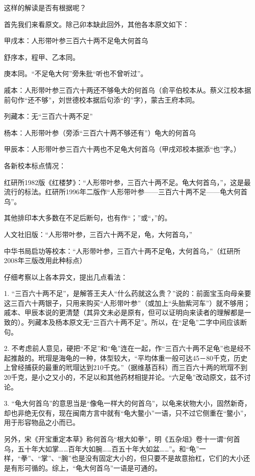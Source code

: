 这样的解读是否有根据呢？

首先我们来看原文。除己卯本缺此回外，其他各本原文如下：

甲戌本：人形带叶参三百六十两不足龟大何首乌

舒序本，程甲、乙本同。

庚本同。``不足龟大何''旁朱批``听也不曾听过''。

戚本：人形带叶参三百六十两还不够龟大的何首乌（俞平伯校本从。蔡义江校本据前句作``还不够''，刘世德校本据后句添``的''字），蒙古王府本同。

列藏本：无``三百六十两不足''

杨本：人形带叶参（旁添``三百六十两不够还有''）龟大的何首乌

甲辰本：人形带叶参三百六十两也不足龟大何首乌（甲戌邓校本据添``也''字。）

各新校本标点情况：

红研所1982版《红楼梦》：``人形带叶参，三百六十两不足。龟大何首乌，''，这是最流行的标法。红研所1996年二版作``人形带叶参------三百六十两不足------龟大何首乌''。

其他排印本大多数在不足后断句，也有作``；''或``，''的。

人文社旧版：``人形带叶参，三百六十两不足，龟，大何首乌，''

中华书局启功等校本：``人形带叶参，三百六十两不足龟，大何首乌，''（红研所2008年三版改用此种标点）

仔细考察以上各本异文，提出几点看法：

1.
``三百六十两不足''，是解答王夫人``什么药就这么贵？''说的：前面宝玉向母亲要这三百六十两银子，只用来购买``人形带叶参''（或加上``头胎紫河车''）就不够用；戚本、甲辰本说的更清楚（其异文未必是原有，但可以证明向来读者的理解都是一致的）。列藏本及杨本原文无``三百六十两不足''。所以，在``足龟''二字中间应该断句。

2.
不考虑前人意见，硬把``不足''和``龟''连在一起，作``三百六十两不足龟''也是经不起推敲的。玳瑁是海龟的一种，体型较大，``平均体重一般可达45－80千克，历史上曾经捕获的最重的玳瑁达到210千克。''（据维基百科）而三百六十两的玳瑁不到20千克，是小之又小的，不足以和其他药材相提并论。``六足龟''改动原文，兹不讨论。

3.
``龟大何首乌''的意思当是``像龟一样大的何首乌''，以龟来状物大小，固然新奇，却也非绝无仅有，现在闽南方言中就有``龟大鳖小''一语，只不过它侧重在``鳖小''，用于形容物品之小而已。

另外，宋《开宝重定本草》称何首乌``根大如拳''，明《五杂俎》卷十一谓``何首乌，五十年大如掌\ldots{}\ldots{}百年大如腕\ldots{}\ldots{}百五十年大如盆\ldots{}\ldots{}''。和``龟''一样，``拳''、``掌''、``腕''也是没有固定大小的，但只要不是故意抬杠，它们的大小还是有形可循的。综上，``龟大何首乌''一语是可通的。

